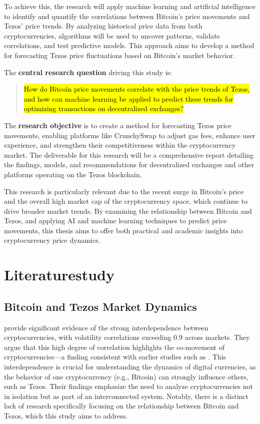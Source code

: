  To achieve this, the research will apply machine learning and artificial intelligence to identify and quantify the correlations between Bitcoin's price movements and Tezos' price trends. By analyzing historical price data from both cryptocurrencies, algorithms will be used to uncover patterns, validate correlations, and test predictive models. This approach aims to develop a method for forecasting Tezos price fluctuations based on Bitcoin's market behavior.
 
 The \textbf{central research question} driving this study is:
 
 \begin{quote} \hl{How do Bitcoin price movements correlate with the price trends of Tezos, and how can machine learning be applied to predict these trends for optimizing transactions on decentralized exchanges?} \end{quote}
 
 The \textbf{research objective} is to create a method for forecasting Tezos price movements, enabling platforms like CrunchySwap to adjust gas fees, enhance user experience, and strengthen their competitiveness within the cryptocurrency market. The deliverable for this research will be a comprehensive report detailing the findings, models, and recommendations for decentralized exchanges and other platforms operating on the Tezos blockchain.
 
 This research is particularly relevant due to the recent surge in Bitcoin's price and the overall high market cap of the cryptocurrency space, which continue to drive broader market trends. By examining the relationship between Bitcoin and Tezos, and applying AI and machine learning techniques to predict price movements, this thesis aims to offer both practical and academic insights into cryptocurrency price dynamics.



\section{Literaturestudy}%
\label{sec:literaturestudy}

\subsection{Bitcoin and Tezos Market Dynamics}
\textcite{hossain2021there} provide significant evidence of the strong interdependence between cryptocurrencies, with volatility correlations exceeding 0.9 across markets. They argue that this high degree of correlation highlights the co-movement of cryptocurrencies—a finding consistent with earlier studies such as \autocite{guesmi2019portfolio}. This interdependence is crucial for understanding the dynamics of digital currencies, as the behavior of one cryptocurrency (e.g., Bitcoin) can strongly influence others, such as Tezos. Their findings emphasize the need to analyze cryptocurrencies not in isolation but as part of an interconnected system. Notably, there is a distinct lack of research specifically focusing on the relationship between Bitcoin and Tezos, which this study aims to address.

